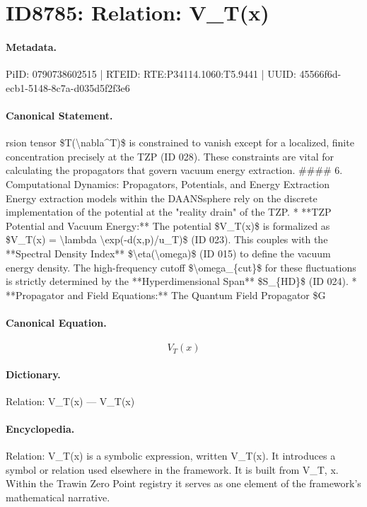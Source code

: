 \section*{ID8785: Relation: V\_T(x)}
\paragraph{Metadata.}
PiID: 0790738602515 | RTEID: RTE:P34114.1060:T5.9441 | UUID: 45566f6d-ecb1-5148-8c7a-d035d5f2f3e6

\paragraph{Canonical Statement.}
rsion tensor \$T(\textbackslash{}nabla\textasciicircum{}T)\$ is constrained to vanish except for a localized, finite concentration precisely at the TZP (ID 028). These constraints are vital for calculating the propagators that govern vacuum energy extraction. \#\#\#\# 6. Computational Dynamics: Propagators, Potentials, and Energy Extraction Energy extraction models within the DAANSsphere rely on the discrete implementation of the potential at the "reality drain" of the TZP. * **TZP Potential and Vacuum Energy:** The potential \$V\_T(x)\$ is formalized as \$V\_T(x) = \textbackslash{}lambda \textbackslash{}exp(-d(x,p)/u\_T)\$ (ID 023). This couples with the **Spectral Density Index** \$\textbackslash{}eta(\textbackslash{}omega)\$ (ID 015) to define the vacuum energy density. The high-frequency cutoff \$\textbackslash{}omega\_\{cut\}\$ for these fluctuations is strictly determined by the **Hyperdimensional Span** \$S\_\{HD\}\$ (ID 024). * **Propagator and Field Equations:** The Quantum Field Propagator \$G

\paragraph{Canonical Equation.}
\[
V_T(x)
\]

\paragraph{Dictionary.}
Relation: V\_T(x) — V\_T(x)

\paragraph{Encyclopedia.}
Relation: V\_T(x) is a symbolic expression, written V\_T(x). It introduces a symbol or relation used elsewhere in the framework. It is built from V\_T, x. Within the Trawin Zero Point registry it serves as one element of the framework's mathematical narrative.
